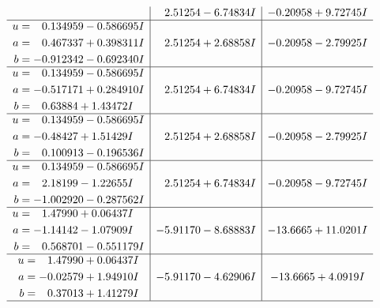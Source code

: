 \documentclass[1p]{elsarticle_modified}
\theoremstyle{definition}
\begin{document}
$$\begin{array}{c|c|c}
 & \phantom{-}2.51254 - 6.74834 I & -0.20958 + 9.72745 I \\ \hline\begin{aligned}
u &= \phantom{-}0.134959 - 0.586695 I \\
a &= \phantom{-}0.467337 + 0.398311 I \\
b &= -0.912342 - 0.692340 I\end{aligned}
 & \phantom{-}2.51254 + 2.68858 I & -0.20958 - 2.79925 I \\ \hline\begin{aligned}
u &= \phantom{-}0.134959 - 0.586695 I \\
a &= -0.517171 + 0.284910 I \\
b &= \phantom{-}0.63884 + 1.43472 I\end{aligned}
 & \phantom{-}2.51254 + 6.74834 I & -0.20958 - 9.72745 I \\ \hline\begin{aligned}
u &= \phantom{-}0.134959 - 0.586695 I \\
a &= -0.48427 + 1.51429 I \\
b &= \phantom{-}0.100913 - 0.196536 I\end{aligned}
 & \phantom{-}2.51254 + 2.68858 I & -0.20958 - 2.79925 I \\ \hline\begin{aligned}
u &= \phantom{-}0.134959 - 0.586695 I \\
a &= \phantom{-}2.18199 - 1.22655 I \\
b &= -1.002920 - 0.287562 I\end{aligned}
 & \phantom{-}2.51254 + 6.74834 I & -0.20958 - 9.72745 I \\ \hline\begin{aligned}
u &= \phantom{-}1.47990 + 0.06437 I \\
a &= -1.14142 - 1.07909 I \\
b &= \phantom{-}0.568701 - 0.551179 I\end{aligned}
 & -5.91170 - 8.68883 I & -13.6665 + 11.0201 I \\ \hline\begin{aligned}
u &= \phantom{-}1.47990 + 0.06437 I \\
a &= -0.02579 + 1.94910 I \\
b &= \phantom{-}0.37013 + 1.41279 I\end{aligned}
 & -5.91170 - 4.62906 I & -13.6665 + 4.0919 I\\
 \hline 
 \end{array}$$\newpage$$\begin{array}{c|c|c}  

\end{array}$$
\end{document}
